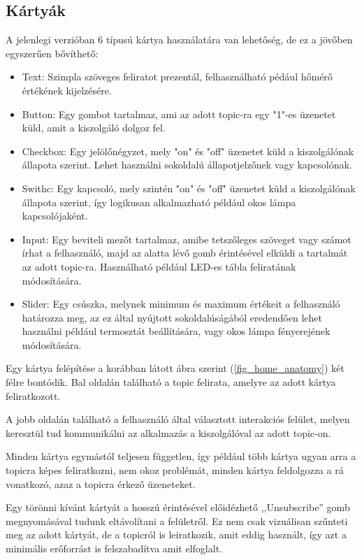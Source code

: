 \documentclass[
]{thesis-ekf}
\theoremstyle{definition}
\theoremstyle{remark}
\begin{document}
\subsection{Kártyák}
A jelenlegi verzióban 6 típusú kártya használatára van lehetőség, de ez a jövőben egyszerűen bővíthető:
\begin{itemize}
	\item Text: Szimpla szöveges feliratot prezentál, felhasználható pédául hőmérő értékének kijelzésére.
	\item Button: Egy gombot tartalmaz, ami az adott topic-ra egy "1"-es üzenetet küld, amit a kiszolgáló
	dolgoz fel.
	\item Checkbox: Egy jelölőnégyzet, mely "on" és "off" üzenetet küld a kiszolgálónak állapota szerint.
	Lehet használni sokoldalú állapotjelzőnek vagy kapcsolónak.
	\item Swithc: Egy kapcsoló, mely szintén "on" és "off" üzenetet küld a kiszolgálónak állapota szerint,
	így logikusan alkalmazható például okos lámpa kapcsolójaként.
	\item Input: Egy beviteli mezőt tartalmaz, amibe tetszőleges szöveget vagy számot írhat a felhasználó,
	majd az alatta lévő gomb érintésével elküldi a tartalmát az adott topic-ra. Használható például LED-es
	tábla feliratának módosítására.
	\item Slider: Egy csúszka, melynek minimum és maximum értékeit a felhasználó határozza meg, az ez
	által nyújtott sokoldalúságából eredendően lehet használni például termosztát beállítására, vagy
	okos lámpa fényerejének módosítására.
\end{itemize}

Egy kártya felépítése a korábban látott ábra szerint (\ref{fig_home_anatomy}) két félre bontódik.
Bal oldalán található a topic felirata, amelyre az adott kártya feliratkozott. 

A jobb oldalán található
a felhasználó által választott interakciós felület, melyen keresztül tud kommunikálni az alkalmazás a
kiszolgálóval az adott topic-on. 

Minden kártya egymástól teljesen független, így például több kártya ugyan
arra a topicra képes feliratkozni, nem okoz problémát, minden kártya feldolgozza a rá vonatkozó,
azaz a topicra érkező üzeneteket.

Egy törönni kívánt kártyát a hosszú érintésével előidézhető ,,Unsubscribe'' gomb megnyomásával tudunk
eltávolítani a felületről. Ez nem csak vizuálisan szűnteti meg az adott kártyát, de a topicról is
leiratkozik, amit eddig használt, így azt a minimális erőforrást is felszabadítva amit elfoglalt. 
\end{document}

